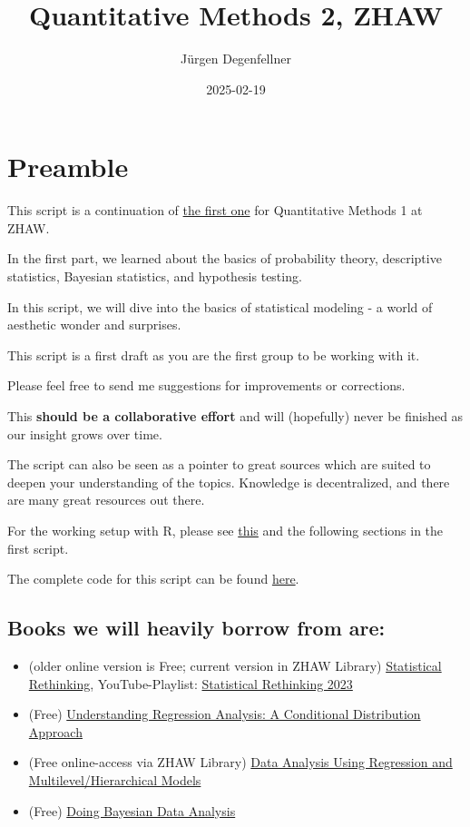 \documentclass[
]{book}
\title{Quantitative Methods 2, ZHAW}
\author{Jürgen Degenfellner}
\date{2025-02-19}
\providecommand{\tightlist}{%
  \setlength{\itemsep}{0pt}\setlength{\parskip}{0pt}}
\begin{document}
\maketitle

{
\setcounter{tocdepth}{1}
\tableofcontents
}
\chapter{Preamble}\label{intro0}

This script is a continuation of
\href{https://jdegenfellner.github.io/Script_QM1_ZHAW/}{the first one} for Quantitative Methods 1
at ZHAW.

In the first part, we learned about the basics of probability theory,
descriptive statistics, Bayesian statistics, and hypothesis testing.

In this script, we will dive into the basics of statistical modeling -
a world of aesthetic wonder and surprises.

This script is a first draft as you are the first group to be working with it.

Please feel free to send me suggestions for improvements or corrections.

This \textbf{should be a collaborative effort} and will (hopefully)
never be finished as our insight grows over time.

The script can also be seen as a pointer to great sources which are
suited to deepen your understanding of the topics. Knowledge is decentralized,
and there are many great resources out there.

For the working setup with R, please
see \href{https://jdegenfellner.github.io/Script_QM1_ZHAW/index.html\#section}{this}
and the following sections in the first script.

The complete code for this script can be found
\href{https://github.com/jdegenfellner/Script_QM2_ZHAW}{here}.

\section{Books we will heavily borrow from are:}\label{books-we-will-heavily-borrow-from-are}

\begin{itemize}
\tightlist
\item
  (older online version is Free; current version in ZHAW Library) \href{https://civil.colorado.edu/~balajir/CVEN6833/bayes-resources/RM-StatRethink-Bayes.pdf}{Statistical Rethinking}, YouTube-Playlist: \href{https://youtu.be/FdnMWdICdRs?si=q2py5QVY_L299hEa}{Statistical Rethinking 2023}
\item
  (Free) \href{https://vdoc.pub/documents/understanding-regression-analysis-a-conditional-distribution-approach-84oqjr8sqva0}{Understanding Regression Analysis: A Conditional Distribution Approach}
\item
  (Free online-access via ZHAW Library) \href{http://www.stat.columbia.edu/~gelman/arm/}{Data Analysis Using Regression and Multilevel/Hierarchical Models}
\item
  (Free) \href{https://nyu-cdsc.github.io/learningr/assets/kruschke_bayesian_in_R.pdf}{Doing Bayesian Data Analysis}
\end{itemize}
\end{document}
